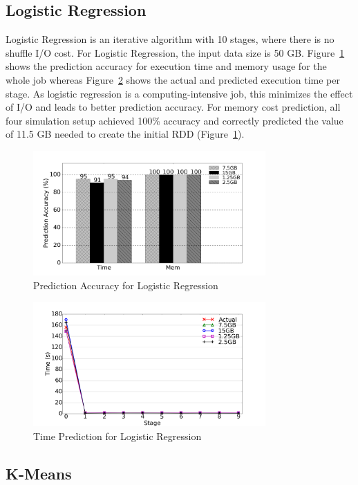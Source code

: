 {\subsection{Logistic Regression}

\noindent
Logistic Regression is an iterative algorithm with 10 stages, where there is no shuffle I/O cost. For Logistic Regression, the input data size is 50 GB. Figure~\ref{lr_accuracy} shows the prediction accuracy for execution time and memory usage for the whole job whereas Figure~\ref{lr_time} shows the actual and predicted execution time per stage. As logistic regression is a computing-intensive job, this minimizes the effect of I/O and leads to better prediction accuracy. For memory cost prediction, all four simulation setup achieved 100\% accuracy and correctly predicted the value of 11.5 GB needed to create the initial RDD (Figure~\ref{lr_accuracy}). 
\begin{figure}[!t]
\centering
\includegraphics[width=3.5in]{figures/lr_accuracy.png}
\caption{Prediction Accuracy for Logistic Regression}
\label{lr_accuracy}
\end{figure}
\begin{figure}[!t]
\centering
\includegraphics[width=3.5in]{figures/lr_time.png}
\caption{Time Prediction for Logistic Regression}
\label{lr_time}
\end{figure}


\subsection{K-Means}

}
